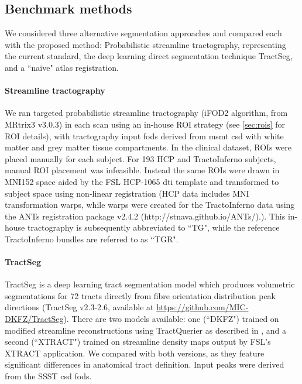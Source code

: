 \subsection{Benchmark methods}

We considered three alternative segmentation approaches and compared each with the proposed method: Probabilistic streamline tractography, representing the current standard, the deep learning direct segmentation technique TractSeg, and a ``naive" atlas registration.

\paragraph*{Streamline tractography}

We ran targeted probabilistic streamline tractography (iFOD2 algorithm\autocite{Tournier2010}, from MRtrix3\autocite{Tournier2019} v3.0.3) in each scan using an in-house ROI strategy (see \ref{sec:rois} for ROI details), with tractography input \gls{fod}s derived from \gls{msmt} \gls{csd} \autocite{Jeurissen2014} with white matter and grey matter tissue compartments.
In the clinical dataset, ROIs were placed manually for each subject.
For 193 HCP and TractoInferno subjects, manual ROI placement was infeasible.
Instead the same ROIs were drawn in MNI152 space aided by the FSL HCP-1065 \gls{dti} template\autocite{FSLATLAS} and transformed to subject space using non-linear registration (HCP data includes MNI transformation warps, while warps were created for the TractoInferno data using the ANTs registration package v2.4.2 (http://stnava.github.io/ANTs/).\autocite{Tustison2013,Avants2011}).
This in-house tractography is subsequently abbreviated to ``TG", while the reference TractoInferno bundles are referred to as ``TGR".

\paragraph*{TractSeg}

TractSeg \autocite{Wasserthal2018} is a deep learning tract segmentation model which produces volumetric segmentations for 72 tracts directly from fibre orientation distribution peak directions (TractSeg v2.3-2.6, available at \url{https://github.com/MIC-DKFZ/TractSeg}).
There are two models available: one (``DKFZ") trained on modified streamline reconstructions using TractQuerier \autocite{Wassermann2016} as described in \textcite{Wasserthal2018}, and a second (``XTRACT") trained on streamline density maps output by FSL's XTRACT application. \autocite{Warrington2020}
We compared with both versions, as they feature significant differences in anatomical tract definition.
Input peaks were derived from the SSST \gls{csd} \gls{fod}s.

